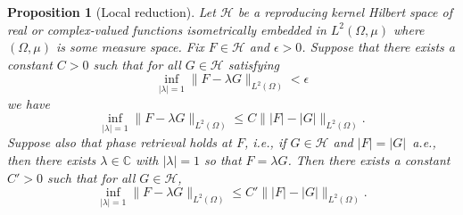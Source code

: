 \documentclass[10pt,a4paper]{amsart}
\newtheorem{proposition}{Proposition}
\begin{document}
\begin{proposition}[Local reduction]\label{prop:local-reduction}
Let \(\mathcal{H}\) be a reproducing kernel Hilbert space of real or complex-valued
functions isometrically embedded in \(L^2(\Omega,\mu)\) where $(\Omega,\mu)$ is some measure space. Fix \(F\in \mathcal{H}\) and
\(\epsilon>0\). Suppose that there exists a constant \(C>0\) such that for
all \(G\in \mathcal{H}\) satisfying
\[
\inf_{\lvert \lambda \rvert=1}\lVert F-\lambda G \rVert_{L^2(\Omega)}<\epsilon
\]
we have
\[
\inf_{\lvert \lambda \rvert=1}\lVert F-\lambda G \rVert_{L^2(\Omega)}
\le
C\lVert \lvert F \rvert-\lvert G \rvert \rVert_{L^2(\Omega)}.
\]
Suppose also that phase retrieval holds at \(F\), i.e., if \(G\in \mathcal{H}\) and
\(\lvert F \rvert=\lvert G \rvert\)~a.e., then there exists \(\lambda\in\mathbb{C}\) with
\(\lvert \lambda \rvert=1\) so that \(F=\lambda G\). Then there exists a constant
\(C'>0\) such that for all \(G\in \mathcal{H}\),
\[
\inf_{\lvert \lambda \rvert=1}\lVert F-\lambda G \rVert_{L^2(\Omega)}
\le
C'\lVert \lvert F \rvert-\lvert G \rvert \rVert_{L^2(\Omega)}.
\]
\end{proposition}
\end{document}
